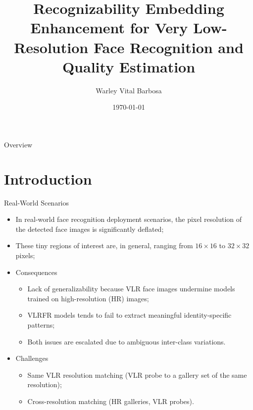 \documentclass[aspectratio=169,xcolor=dvipsnames]{beamer}
\title[Recognizability Embedding Enhancement for VLRFR \& QE]{Recognizability Embedding Enhancement for Very Low-Resolution Face Recognition and Quality Estimation} %
\author[Barbosa, Warley .V]{Warley Vital Barbosa}
\date{\today} %
\begin{document}
\begin{frame}[plain]
    \titlepage
\end{frame}

\begin{frame}{Overview}
    \tableofcontents
\end{frame}

\section{Introduction}

\begin{frame}{Real-World Scenarios}
    \begin{itemize} 
        \item In real-world face recognition deployment scenarios, the pixel resolution of the detected face images is significantly deflated;%
        \item These tiny regions of interest are, in general, ranging from $16\times16$ to $32\times32$ pixels;%
        \item Consequences
        \begin{itemize}
            \item Lack of generalizability because VLR face images undermine models trained on high-resolution (HR) images; 
            \item VLRFR models tends to fail to extract meaningful identity-specific patterns;
            \item Both issues are escalated due to ambiguous inter-class variations.
        \end{itemize}
        \item Challenges
        \begin{itemize}
            \item Same VLR resolution matching (VLR probe to a gallery set of the same resolution);
            \item Cross-resolution matching (HR galleries, VLR probes).
        \end{itemize}
    \end{itemize}
\end{frame}
\end{document}
